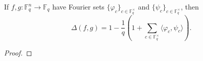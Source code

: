 \begin{theorem}
\label{lem:ff-distance-formula}
\leanok
If $f,g : \mathbb{F}_q^n \to \mathbb{F}_q$ have Fourier sets
  $\{\varphi_c\}_{c \in \mathbb{F}_q^\times}$ and
  $\{\psi_c\}_{c \in \mathbb{F}_q^\times}$, then
  \[
    \Delta(f,g)
    = 1 - \frac{1}{q}\left(1 + \sum_{c \in \mathbb{F}_q^\times}
      \langle \varphi_c,\psi_c\rangle\right).
  \]
\end{theorem}
\begin{proof}
\end{proof}

